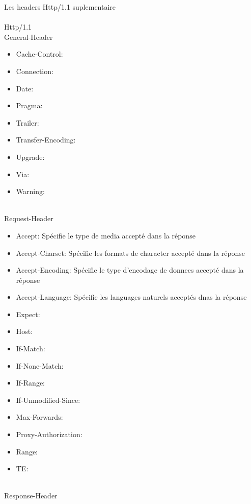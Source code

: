 \documentclass{scrreprt}
\begin{document}
Les headers Http/1.1 suplementaire\\
\\
Http/1.1\\
    General-Header\\
        \begin{itemize}
        \item Cache-Control:      
        \item Connection:     
        \item Date:            
        \item Pragma:          
        \item Trailer:         
        \item Transfer-Encoding:
        \item Upgrade:          
        \item Via:              
        \item Warning:          
        \end{itemize}
\\
    Request-Header\\
        \begin{itemize}
        \item Accept: Spécifie le type de media accepté dans la réponse              
        \item Accept-Charset: Spécifie les formats de character accepté dans la réponse
        \item Accept-Encoding: Spécifie le type d'encodage de donnees accepté dans la réponse   
        \item Accept-Language: Spécifie les languages naturels acceptés dnas la réponse 
        \item Expect:                 
        \item Host:             
        \item If-Match:         
        \item If-None-Match:    
        \item If-Range:         
        \item If-Unmodified-Since:
        \item Max-Forwards:       
        \item Proxy-Authorization:
        \item Range:              
        \item TE:                 
        \end{itemize}
\\
    Response-Header\\
\end{document}
